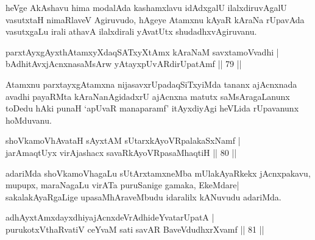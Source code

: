 \begin{artha}
heVge AkAshavu hima modalAda kashamxlavu idAdxgalU ilalxdiruvAgalU vasutxtaH nimaRlaveV Agiruvudo, hAgeye Atamxnu kAyaR kAraNa rUpavAda vasutxgaLu irali athavA ilalxdirali yAvatUtx shudadhxvAgiruvanu.
\end{artha}

\begin{shl}
parxtAyxgAyxthAtamxyXdaqSATxyX\s \s tAmx kAraNaM savxtamoVvadhi |\\
bAdhitAvx\s jAcnxnasaMsArw yAtayxpUvARdirUpatAmf \hfill || 79 ||
\end{shl}

\begin{artha}
Atamxnu parxtayxgAtamxna nijasavxrUpadaqSiTxyiMda tananx ajAcnxnada avadhi payaRMta kAraNanAgidadxrU ajAcnxna matutx saMsAragaLanunx toDedu hAki punaH `apUvaR manaparamf' itAyxdiyAgi heVLida rUpavanunx hoMduvanu.
\end{artha}


\begin{shl}
shoVkamoVhAvataH sAyxtAM sUtarxkAyoVRpalakaSxNamf |\\
jarAmaqtUyx virAjashacx savaRkAyoVRpasaMhaqtiH \hfill || 80 ||
\end{shl}

\begin{artha}
adariMda shoVkamoVhagaLu sUtArxtamxneMba mUlakAyaRkekx jAcnxpakavu, mupupx, maraNagaLu virATa puruSanige gamaka, EkeMdare| sakalakAyaRgaLige upasaMhAraveMbudu idaralilx kANuvudu adariMda.
\end{artha}

\begin{shl}
adhAyxtAmxdayxdhiyajAcnxdeVrAdhideYvatarUpatA |\\
purukotxV\s thaRvatiV ceYvaM sati savAR BaveVdudhxrXvamf \hfill || 81 ||
\end{shl}

